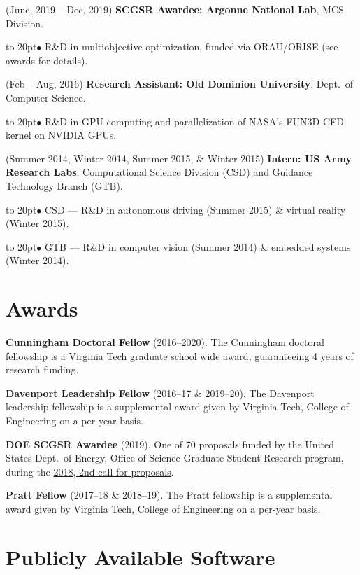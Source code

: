 \documentclass[12pt]{article}
\def\bullitem{\par\hangindent=15pt \hangafter=1
\noindent\hbox to 20pt{\hfil$\bullet$\hfil}\ignorespaces}
\begin{document}
\medskip

\hangindent=0.3in
(June, 2019 -- Dec, 2019)
\textbf{SCGSR Awardee: Argonne National Lab}, MCS Division.
\bullitem
R\&D in multiobjective optimization, funded via ORAU/ORISE
(see awards for details).

\medskip

\hangindent=0.3in
(Feb -- Aug, 2016)
\textbf{Research Assistant: Old Dominion University},
Dept.\ of Computer Science.
\bullitem
R\&D in GPU computing and parallelization of NASA's FUN3D CFD kernel on
NVIDIA GPUs.

\medskip

\hangindent=0.3in
(Summer 2014, Winter 2014, Summer 2015, \& Winter 2015)
\textbf{Intern: US Army Research Labs}, 
Computational Science Division (CSD) and Guidance Technology Branch (GTB).
\bullitem
CSD --- R\&D in autonomous driving (Summer 2015) \&
virtual reality (Winter 2015).
\bullitem
GTB --- R\&D in computer vision (Summer 2014) \& embedded systems (Winter 2014).

\medskip

\newpage

\section*{Awards}

\textbf{Cunningham Doctoral Fellow} (2016--2020).
The 
\href{https://graduateschool.vt.edu/funding/types-of-funding/funding-sponsored-by-the-graduate-school/cunningham-doctoral-assistantships.html}
{Cunningham doctoral fellowship} is a Virginia Tech graduate school wide
award, guaranteeing 4 years of research funding.

\textbf{Davenport Leadership Fellow} (2016--17 \& 2019--20).
The Davenport leadership fellowship is a supplemental award given by
Virginia Tech, College of Engineering on a per-year basis.

\textbf{DOE SCGSR Awardee} (2019).
One of 70 proposals funded by the United States Dept.\ of Energy,
Office of Science Graduate Student Research program, during the
\href{https://www.energy.gov/articles/doe-s-science-graduate-student-research-program-selects-70-students-pursue-research-doe}{2018, 2nd call for proposals}.

\textbf{Pratt Fellow} (2017--18 \& 2018--19).
The Pratt fellowship is a supplemental award given by
Virginia Tech, College of Engineering on a per-year basis.

\section*{Publicly Available Software}
\end{document}
